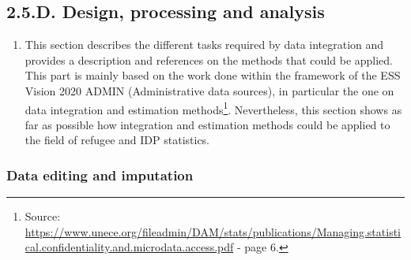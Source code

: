 \documentclass[
]{article}
\providecommand{\tightlist}{%
  \setlength{\itemsep}{0pt}\setlength{\parskip}{0pt}}
\begin{document}
\hypertarget{section-4}{%
\subsubsection{}\label{section-4}}

\hypertarget{d.-design-processing-and-analysis-1}{%
\subsection{2.5.D. Design, processing and analysis}\label{d.-design-processing-and-analysis-1}}

\begin{enumerate}
\def\labelenumi{\arabic{enumi}.}
\setcounter{enumi}{218}
\tightlist
\item
  This section describes the different tasks required by data
  integration and provides a description and references on the methods
  that could be applied. This part is mainly based on the work done
  within the framework of the ESS Vision 2020 ADMIN (Administrative
  data sources), in particular the one on data integration and
  estimation methods\footnote{Source:
    \url{https://www.unece.org/fileadmin/DAM/stats/publications/Managing.statistical.confidentiality.and.microdata.access.pdf}
    - page 6.}. Nevertheless, this section shows as far as
  possible how integration and estimation methods could be applied to
  the field of refugee and IDP statistics.
\end{enumerate}

\hypertarget{d.1.-data-editing-and-imputation}{%
\subsubsection{Data editing and imputation}\label{d.1.-data-editing-and-imputation}}
\end{document}

